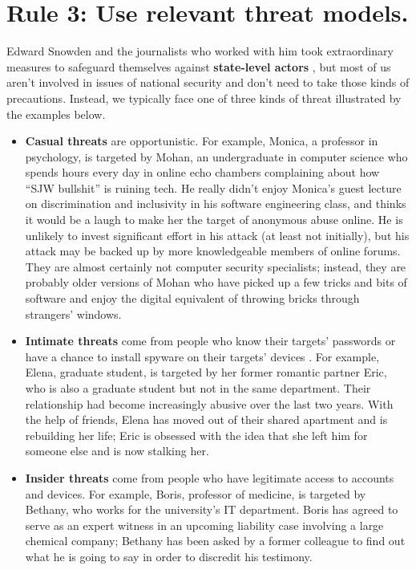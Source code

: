 \documentclass[10pt,letterpaper]{article}
\begin{document}
\section*{Rule 3: Use relevant threat models.}

Edward Snowden and the journalists who worked with him took extraordinary
measures to safeguard themselves against \textbf{state-level actors}
\cite{Snow2019}, but most of us aren't involved in issues of national
security and don't need to take those kinds of precautions. Instead, we
typically face one of three kinds of threat illustrated by the examples below.

\begin{itemize}
\item
  \textbf{Casual threats} are opportunistic. For example, Monica, a professor in
  psychology, is targeted by Mohan, an undergraduate in computer science who
  spends hours every day in online echo chambers complaining about how ``SJW
  bullshit'' is ruining tech. He really didn't enjoy Monica's guest lecture on
  discrimination and inclusivity in his software engineering class, and thinks
  it would be a laugh to make her the target of anonymous abuse online. He is
  unlikely to invest significant effort in his attack (at least not initially),
  but his attack may be backed up by more knowledgeable members of online
  forums. They are almost certainly not computer security specialists; instead,
  they are probably older versions of Mohan who have picked up a few tricks and
  bits of software and enjoy the digital equivalent of throwing bricks through
  strangers' windows.

\item
  \textbf{Intimate threats} come from people who know their targets' passwords
  or have a chance to install spyware on their targets' devices \cite{Leit2019}.
  For example, Elena, graduate student, is targeted by her former romantic
  partner Eric, who is also a graduate student but not in the same department.
  Their relationship had become increasingly abusive over the last two years.
  With the help of friends, Elena has moved out of their shared apartment and is
  rebuilding her life; Eric is obsessed with the idea that she left him for
  someone else and is now stalking her.

\item
  \textbf{Insider threats} come from people who have legitimate access to
  accounts and devices. For example, Boris, professor of medicine, is targeted
  by Bethany, who works for the university's IT department.  Boris has agreed to
  serve as an expert witness in an upcoming liability case involving a large
  chemical company; Bethany has been asked by a former colleague to find out
  what he is going to say in order to discredit his testimony.
\end{itemize}
\end{document}
